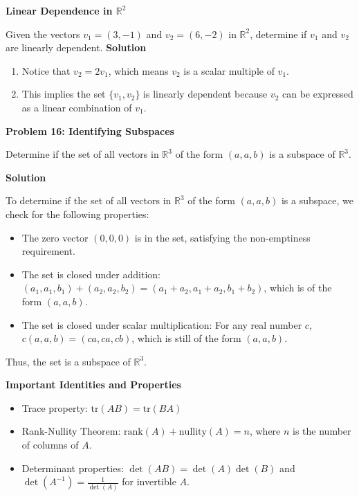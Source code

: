 \documentclass[8pt, a4paper, landscape]{extarticle}
\begin{document}
\begin{multicols*}{5}
  \textbf{Linear Dependence in $\mathbb{R}^2$}

  Given the vectors $v_1 = (3, -1)$ and $v_2 = (6, -2)$ in $\mathbb{R}^2$, determine if $v_1$ and $v_2$ are linearly dependent.
  \textbf{Solution}
  \begin{enumerate}
    \item Notice that $v_2 = 2v_1$, which means $v_2$ is a scalar multiple of $v_1$.
    \item This implies the set $\{v_1, v_2\}$ is linearly dependent because $v_2$ can be expressed as a linear combination of $v_1$.
  \end{enumerate}

  \textbf{Problem 16: Identifying Subspaces}

  Determine if the set of all vectors in $\mathbb{R}^3$ of the form $(a, a, b)$ is a subspace of $\mathbb{R}^3$.
    
  \textbf{Solution}

  To determine if the set of all vectors in $\mathbb{R}^3$ of the form $(a, a, b)$ is a subspace, we check for the following properties:
  \begin{itemize}
    \item The zero vector $(0, 0, 0)$ is in the set, satisfying the non-emptiness requirement.
    \item The set is closed under addition: $(a_1, a_1, b_1) + (a_2, a_2, b_2) = (a_1 + a_2, a_1 + a_2, b_1 + b_2)$, which is of the form $(a, a, b)$.
    \item The set is closed under scalar multiplication: For any real number $c$, $c(a, a, b) = (ca, ca, cb)$, which is still of the form $(a, a, b)$.
  \end{itemize}
  Thus, the set is a subspace of $\mathbb{R}^3$.

  \textbf{Important Identities and Properties}
  \begin{itemize}
    \item Trace property: $\text{tr}(AB) = \text{tr}(BA)$
    \item Rank-Nullity Theorem: $\text{rank}(A) + \text{nullity}(A) = n$, where $n$ is the number of columns of $A$.
    \item Determinant properties: $\det(AB) = \det(A)\det(B)$ and $\det(A^{-1}) = \frac{1}{\det(A)}$ for invertible $A$.
  \end{itemize}

\end{multicols*}

\pagebreak
\end{document}
